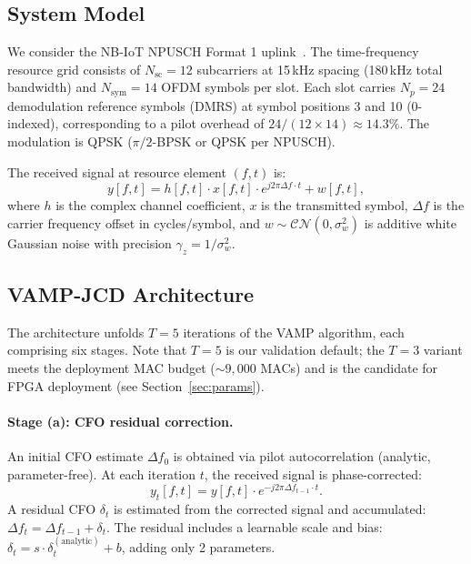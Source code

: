 \documentclass{article}
\begin{document}
\subsection{System Model}

We consider the NB-IoT NPUSCH Format 1 uplink~\cite{3gppTR36763}. The time-frequency resource grid consists of $N_{\mathrm{sc}} = 12$ subcarriers at 15\,kHz spacing (180\,kHz total bandwidth) and $N_{\mathrm{sym}} = 14$ OFDM symbols per slot. Each slot carries $N_p = 24$ demodulation reference symbols (DMRS) at symbol positions 3 and 10 (0-indexed), corresponding to a pilot overhead of $24/(12 \times 14) \approx 14.3\%$. The modulation is QPSK ($\pi/2$-BPSK or QPSK per NPUSCH).

The received signal at resource element $(f, t)$ is:
\begin{equation}
y[f, t] = h[f, t] \cdot x[f, t] \cdot e^{j2\pi \Delta f \cdot t} + w[f, t],
\end{equation}
where $h$ is the complex channel coefficient, $x$ is the transmitted symbol, $\Delta f$ is the carrier frequency offset in cycles/symbol, and $w \sim \mathcal{CN}(0, \sigma_w^2)$ is additive white Gaussian noise with precision $\gamma_z = 1/\sigma_w^2$.

\subsection{VAMP-JCD Architecture}

The architecture unfolds $T = 5$ iterations of the VAMP algorithm, each comprising six stages. Note that $T=5$ is our validation default; the $T=3$ variant meets the deployment MAC budget ($\sim 9{,}000$ MACs) and is the candidate for FPGA deployment (see Section~\ref{sec:params}).

\paragraph{Stage (a): CFO residual correction.}
An initial CFO estimate $\Delta f_0$ is obtained via pilot autocorrelation (analytic, parameter-free). At each iteration $t$, the received signal is phase-corrected:
\begin{equation}
y_t[f, t] = y[f, t] \cdot e^{-j2\pi \Delta f_{t-1} \cdot t}.
\end{equation}
A residual CFO $\delta_t$ is estimated from the corrected signal and accumulated: $\Delta f_t = \Delta f_{t-1} + \delta_t$. The residual includes a learnable scale and bias: $\delta_t = s \cdot \delta_t^{\mathrm{(analytic)}} + b$, adding only 2 parameters.
\end{document}
